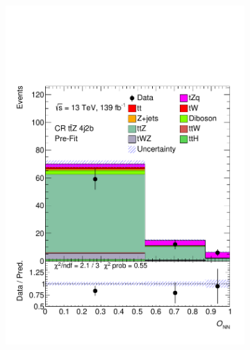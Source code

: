 \begin{figure}[!h]
\begin{subfigure}[b]{0.33\linewidth}
    \includegraphics[width=\textwidth]{ubonn-thesis/Chapters/Chapters_07/Figure/Data/CR_4j2b.pdf} 
  \end{subfigure} 
  \begin{subfigure}[b]{0.33\linewidth}
    \centering

\end{subfigure}
\end{figure}
